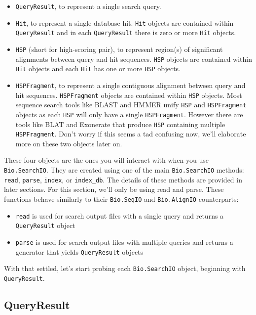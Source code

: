 \begin{itemize}
\item \verb|QueryResult|, to represent a single search query.
\item \verb|Hit|, to represent a single database hit. \verb|Hit| objects are
    contained within \verb|QueryResult| and in each \verb|QueryResult| there is
    zero or more \verb|Hit| objects.
\item \verb|HSP| (short for high-scoring pair), to represent region(s) of
    significant alignments between query and hit sequences. \verb|HSP| objects
    are contained within \verb|Hit| objects and each \verb|Hit| has one or more
    \verb|HSP| objects.
\item \verb|HSPFragment|, to represent a single contiguous alignment between
    query and hit sequences. \verb|HSPFragment| objects are contained within
    \verb|HSP| objects. Most sequence search tools like BLAST and HMMER unify
    \verb|HSP| and \verb|HSPFragment| objects as each \verb|HSP| will only have
    a single \verb|HSPFragment|. However there are tools like BLAT and Exonerate
    that produce \verb|HSP| containing multiple \verb|HSPFragment|. Don't worry
    if this seems a tad confusing now, we'll elaborate more on these two objects
    later on.
\end{itemize}

These four objects are the ones you will interact with when you use
\verb|Bio.SearchIO|. They are created using one of the main \verb|Bio.SearchIO|
methods: \verb|read|, \verb|parse|, \verb|index|, or \verb|index_db|. The
details of these methods are provided in later sections. For this section, we'll
only be using read and parse. These functions behave similarly to their
\verb|Bio.SeqIO| and \verb|Bio.AlignIO| counterparts:

\begin{itemize}
\item \verb|read| is used for search output files with a single query and
    returns a \verb|QueryResult| object
\item \verb|parse| is used for search output files with multiple queries and
    returns a generator that yields \verb|QueryResult| objects
\end{itemize}

With that settled, let's start probing each \verb|Bio.SearchIO| object,
beginning with \verb|QueryResult|.

\subsection{QueryResult}
\label{sec:searchio-qresult}

